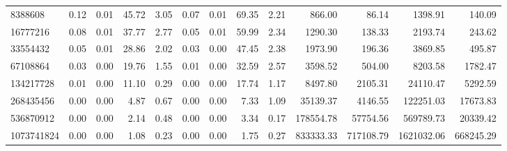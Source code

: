 \begin{tabular}{lrrrrrrrrrrrr}
8388608 & 0.12 & 0.01 & 45.72 & 3.05 & 0.07 & 0.01 & 69.35 & 2.21 & 866.00 & 86.14 & 1398.91 & 140.09 \\
16777216 & 0.08 & 0.01 & 37.77 & 2.77 & 0.05 & 0.01 & 59.99 & 2.34 & 1290.30 & 138.33 & 2193.74 & 243.62 \\
33554432 & 0.05 & 0.01 & 28.86 & 2.02 & 0.03 & 0.00 & 47.45 & 2.38 & 1973.90 & 196.36 & 3869.85 & 495.87 \\
67108864 & 0.03 & 0.00 & 19.76 & 1.55 & 0.01 & 0.00 & 32.59 & 2.57 & 3598.52 & 504.00 & 8203.58 & 1782.47 \\
134217728 & 0.01 & 0.00 & 11.10 & 0.29 & 0.00 & 0.00 & 17.74 & 1.17 & 8497.80 & 2105.31 & 24110.47 & 5292.59 \\
268435456 & 0.00 & 0.00 & 4.87 & 0.67 & 0.00 & 0.00 & 7.33 & 1.09 & 35139.37 & 4146.55 & 122251.03 & 17673.83 \\
536870912 & 0.00 & 0.00 & 2.14 & 0.48 & 0.00 & 0.00 & 3.34 & 0.17 & 178554.78 & 57754.56 & 569789.73 & 20339.42 \\
1073741824 & 0.00 & 0.00 & 1.08 & 0.23 & 0.00 & 0.00 & 1.75 & 0.27 & 833333.33 & 717108.79 & 1621032.06 & 668245.29 \\
\bottomrule
\end{tabular}
